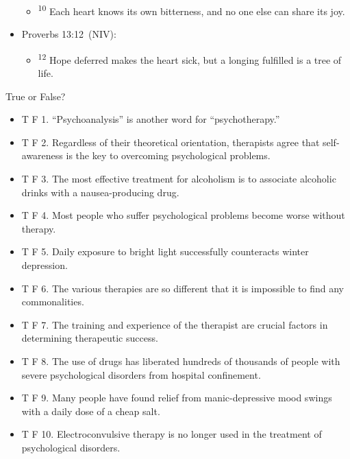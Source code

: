 \documentclass[
]{book}
\providecommand{\tightlist}{%
  \setlength{\itemsep}{0pt}\setlength{\parskip}{0pt}}
\begin{document}
\begin{reflect}
\begin{itemize}
  \begin{itemize}
  \tightlist
  \item
    \textsuperscript{10} Each heart knows its own bitterness, and no one else can share its joy.\\
  \end{itemize}
\item
  Proverbs 13:12~(NIV):

  \begin{itemize}
  \tightlist
  \item
    \textsuperscript{12} Hope deferred makes the heart sick, but a longing fulfilled is a tree of life.
  \end{itemize}
\end{itemize}

True or False?

\begin{itemize}
\tightlist
\item
  T F 1. ``Psychoanalysis'' is another word for ``psychotherapy.''\\
\item
  T F 2. Regardless of their theoretical orientation, therapists agree that self-awareness is the key to overcoming psychological problems.\\
\item
  T F 3. The most effective treatment for alcoholism is to associate alcoholic drinks with a nausea-producing drug.\\
\item
  T F 4. Most people who suffer psychological problems become worse without therapy.\\
\item
  T F 5. Daily exposure to bright light successfully counteracts winter depression.\\
\item
  T F 6. The various therapies are so different that it is impossible to find any commonalities.\\
\item
  T F 7. The training and experience of the therapist are crucial factors in determining therapeutic success.\\
\item
  T F 8. The use of drugs has liberated hundreds of thousands of people with severe psychological disorders from hospital confinement.\\
\item
  T F 9. Many people have found relief from manic-depressive mood swings with a daily dose of a cheap salt.\\
\item
  T F 10. Electroconvulsive therapy is no longer used in the treatment of psychological disorders.
\end{itemize}


\end{reflect}
\end{document}

